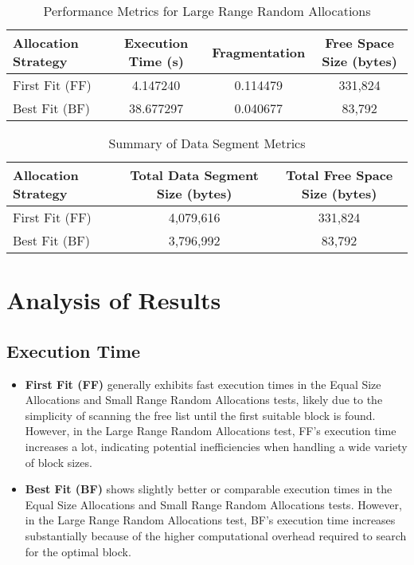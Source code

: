 \documentclass[12pt]{article}
\begin{document}
\begin{table}[h]
    \centering
    \caption{Performance Metrics for Large Range Random Allocations}
    \begin{tabular}{@{}lccc@{}}
        \toprule
        Allocation Strategy & Execution Time (s) & Fragmentation & Free Space Size (bytes) \\ \midrule
        First Fit (FF)       & 4.147240            & 0.114479      & 331,824                   \\
        Best Fit (BF)        & 38.677297           & 0.040677      & 83,792                    \\ \bottomrule
    \end{tabular}
    \label{tab:large_range_rand}
\end{table}

\begin{table}[h]
    \centering
    \caption{Summary of Data Segment Metrics}
    \begin{tabular}{@{}lcc@{}}
        \toprule
        Allocation Strategy & Total Data Segment Size (bytes) & Total Free Space Size (bytes) \\ \midrule
        First Fit (FF)       & 4,079,616                        & 331,824                        \\
        Best Fit (BF)        & 3,796,992                        & 83,792                         \\ \bottomrule
    \end{tabular}
    \label{tab:summary_metrics}
\end{table}

\section{Analysis of Results}
\subsection{Execution Time}
\begin{itemize}
    \item \textbf{First Fit (FF)} generally exhibits fast execution times in the Equal Size Allocations and Small Range Random Allocations tests, likely due to the simplicity of scanning the free list until the first suitable block is found. However, in the Large Range Random Allocations test, FF's execution time increases a lot, indicating potential inefficiencies when handling a wide variety of block sizes.
    \item \textbf{Best Fit (BF)} shows slightly better or comparable execution times in the Equal Size Allocations and Small Range Random Allocations tests. However, in the Large Range Random Allocations test, BF's execution time increases substantially because of the higher computational overhead required to search for the optimal block.
\end{itemize}
\end{document}
